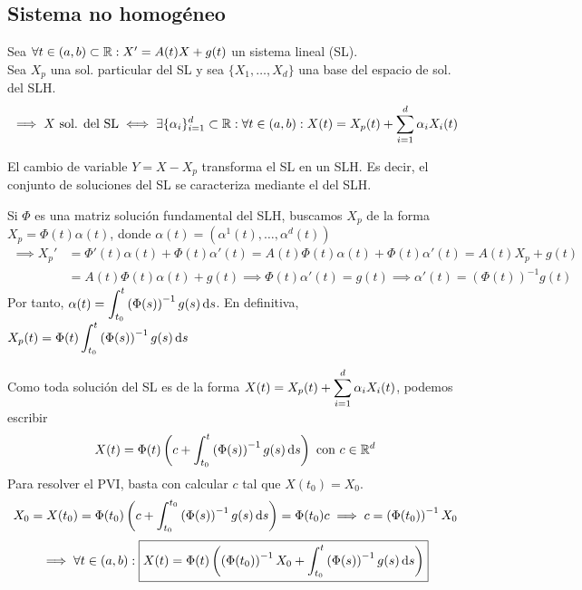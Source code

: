 \subsection{Sistema no homogéneo}

\begin{prop}
	Sea $\forall t \in (a,b) \subset \mathbb{R} : X'=A(t)X + g(t)$ un sistema lineal (SL).\\
	Sea $X_p$ una sol. particular del SL y sea $\{X_1, \dots, X_d\}$ una base del espacio de sol. del SLH.
	\[\implies X \text{ sol. del SL} \iff \exists \{\alpha_i\}_{i=1}^d \subset \mathbb{R} :\forall t \in (a, b) : X(t) = X_p(t) + \sum_{i=1}^{d} \alpha_i X_i(t)\]
	\begin{dem} %
		El cambio de variable $Y = X - X_p$ transforma el SL en un SLH. Es decir, el conjunto de soluciones del SL se caracteriza mediante el del SLH.
	\end{dem}
\end{prop}


Si $\Phi$ es una matriz solución fundamental del SLH, buscamos $X_p$ de la forma $X_p = \Phi(t) \alpha(t)$, donde $\alpha(t) = \left(\alpha^1(t), \dots, \alpha^d(t)\right)$
\[\begin{aligned}
		\implies X_p' & = \Phi'(t) \alpha(t) + \Phi(t) \alpha'(t) = A(t) \Phi(t) \alpha(t) + \Phi(t) \alpha'(t) = A(t) X_p + g(t)              \\
		              & = A(t) \Phi(t) \alpha(t) + g(t) \implies \Phi(t)\alpha'(t) = g(t) \implies \alpha'(t) = \left(\Phi(t)\right)^{-1} g(t)
	\end{aligned}\]
Por tanto, $\ds \alpha(t) = \int_{t_0}^{t} \left(\Phi(s)\right)^{-1} g(s) \odif{s}$. En definitiva, $\ds X_p(t) = \Phi(t) \int_{t_0}^{t} \left(\Phi(s)\right)^{-1} g(s) \odif{s}$

Como toda solución del SL es de la forma $\displaystyle X(t) = X_p(t) + \sum_{i=1}^{d} \alpha_i X_i(t)$, podemos escribir
\[X(t) = \Phi(t) \left(c + \int_{t_0}^{t} \left(\Phi(s)\right)^{-1} g(s) \odif{s}\right) \tex{ con } c \in \R^d\]
Para resolver el PVI, basta con calcular $c$ tal que $X(t_0) = X_0$.
\[X_0 = X(t_0) = \Phi(t_0) \left(c + \int_{t_0}^{t_0} \left(\Phi(s)\right)^{-1} g(s) \odif{s}\right) = \Phi(t_0) c \implies c = \left(\Phi(t_0)\right)^{-1} X_0\]
\[\implies \forall t \in (a, b) : \boxed{X(t) = \Phi(t) \left(\left(\Phi(t_0)\right)^{-1} X_0 + \int_{t_0}^{t} \left(\Phi(s)\right)^{-1} g(s) \odif{s}\right)}\]